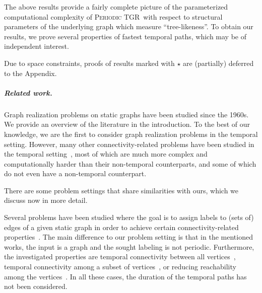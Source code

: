 \documentclass[a4paper,UKenglish,cleveref, autoref, thm-restate]{lipics-v2021}
\newcommand{\deltaExact}{\textsc{Periodic TGR}}
\begin{document}
The above results provide a fairly complete picture of the parameterized computational complexity of \deltaExact\ with respect to structural parameters of the underlying graph which measure ``tree-likeness''. To obtain our results, we prove several properties of fastest temporal paths, which may be of independent interest.

Due to space constraints, proofs of results marked with $\star$ are (partially) deferred to the Appendix.


\subparagraph{Related work.} Graph realization problems on static graphs have been studied since the 1960s. We provide an overview of the literature in the introduction. 
To the best of our knowledge, we are the first to consider graph realization problems in the temporal setting. However, many other connectivity-related problems have been studied in the temporal setting~\cite{Mertzios-transitivity21,Akrida-explorer-21,enright2021deleting,MolterRZ21,klobas2023interference,deligkas2022optimizing,erlebach2021temporal,Flu+19a,Zsc+19,CasteigtsCS22,FuchsleMNR22}, most of which are much more complex and computationally harder than their non-temporal counterparts, and some of which do not even have a non-temporal counterpart.

There are some problem settings that share similarities with ours, which we discuss now in more detail.

Several problems have been studied where the goal is to assign labels to (sets of) edges of a given static graph in order to achieve certain connectivity-related properties~\cite{KlobasMMS22,MertziosMS19,akrida2017complexity,enright2021assigning}. The main difference to our problem setting is that in the mentioned works, the input is a graph and the sought labeling is not periodic. Furthermore, the investigated properties are temporal connectivity between all vertices~\cite{KlobasMMS22,MertziosMS19,akrida2017complexity}, temporal connectivity among a subset of vertices~\cite{KlobasMMS22}, or reducing reachability among the vertices~\cite{enright2021assigning}. In all these cases, the duration of the temporal paths has not been considered.


\end{document}
